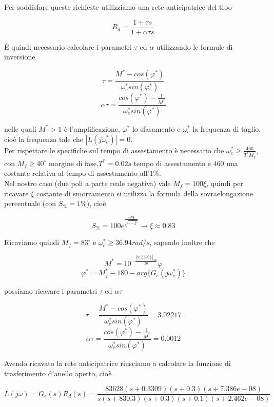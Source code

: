 \documentclass{article}
\begin{document}
Per soddisfare queste richieste utilizziamo una rete anticipatrice del tipo
\begin{large}
\[
R_d=\frac{1+\tau s}{1 + \alpha\tau s}
\]
\end{large}
È quindi necessario calcolare i parametri $\tau$ ed $\alpha$ utilizzando le formule di inversione
\begin{large}
\[
\tau=\frac{M^*-cos(\varphi^*)}{\omega_c^* sin(\varphi^*)}
\]
\[
\alpha\tau=\frac{cos(\varphi^*)-\frac{1}{M^*}}{\omega_c^* sin(\varphi^*)}
\]
\end{large}
nelle quali $M^* > 1$ è l'amplificazione, $\varphi^*$ lo sfasamento e $\omega_c^*$ la frequenza di taglio, cioè la frequenza tale che $|L(j\omega_c^*)|=0$.\\Per rispettare le specifiche sul tempo di assestamento è necessario che $\omega_c^*\geq \frac{460}{T^*M_f}$, con $M_f\geq40^{\circ}$ margine di fase,$T^*=0.02 s$ tempo di assestamento e $460$ una costante relativa al tempo di assestamento all'$1\%$.\\
Nel nostro caso (due poli a parte reale negativa) vale $M_f=100\xi$, quindi per ricavare $\xi$ costante di smorzamento si utilizza la formula della sovraelongazione percentuale (con $S_\%=1\%$), cioè 
\begin{large}
\[
S_\%=100 e^{\frac{-\pi\xi}{\sqrt{1-\xi^2}}} \longrightarrow \xi\approx 0.83
\]
\end{large}
Ricaviamo quindi $M_f=83^{\circ}$ e $\omega_c^*\geq 36.94 rad/s$, sapendo inoltre che
\begin{large}
\[
M^*=10^{-\frac{|G_e(j\omega_c^*)|_{dB}}{20}}
\varphi
\]
\[
\varphi^*=M_f^*-180-arg\{G_e(j\omega_c^*)\}
\]
\end{large}
possiamo ricavare i parametri $\tau$ ed $\alpha\tau$
\begin{large}
\[
\tau=\frac{M^*-cos(\varphi^*)}{\omega_c^* sin(\varphi^*)}=3.02217
\]
\[
\alpha\tau=\frac{cos(\varphi^*)-\frac{1}{M^*}}{\omega_c^* sin(\varphi^*)}=0.0012
\]
\end{large}
Avendo ricavato la rete anticipatrice riusciamo a calcolare la funzione di trasferimento d'anello aperto, cioè
\begin{large}
\[
L(j\omega)=G_e(s)R_d(s)=\frac{83628 (s+0.3309) (s+0.3) (s+7.386e-08)}{s (s+830.3) (s+0.3) (s+0.1) (s+2.462e-08)}
\]
\end{large}
\end{document}
